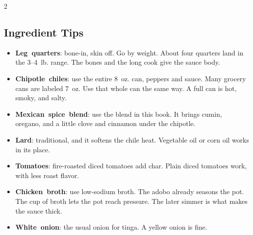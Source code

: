 \documentclass[11pt,letterpaper]{article}
\begin{document}
{\begin{multicols}{2}
\subsection*{Ingredient Tips}
\begin{itemize}
    \item \textbf{Leg~quarters}: bone-in, skin off. Go by weight. About four quarters land in the 3--4~lb. range. The bones and the long cook give the sauce body.
    \item \textbf{Chipotle~chiles}: use the entire 8~oz. can, peppers and sauce. Many grocery cans are labeled 7~oz. Use that whole can the same way. A full can is hot, smoky, and salty.
    \item \textbf{Mexican~spice~blend}: use the blend in this book. It brings cumin, oregano, and a little clove and cinnamon under the chipotle.
    \item \textbf{Lard}: traditional, and it softens the chile heat. Vegetable oil or corn oil works in its place.
    \item \textbf{Tomatoes}: fire-roasted diced tomatoes add char. Plain diced tomatoes work, with less roast flavor.
    \item \textbf{Chicken~broth}: use low-sodium broth. The adobo already seasons the pot. The cup of broth lets the pot reach pressure. The later simmer is what makes the sauce thick.
    \item \textbf{White~onion}: the usual onion for tinga. A yellow onion is fine.
\end{itemize}


\end{multicols}}
\end{document}
